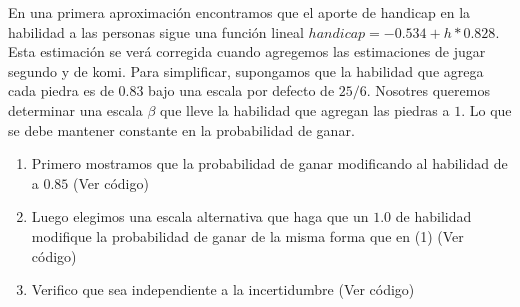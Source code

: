 \documentclass[a4paper,10pt]{article}
\begin{document}
En una primera aproximaci\'on encontramos que el aporte de handicap en la habilidad a las personas sigue una funci\'on lineal $handicap = -0.534 + h * 0.828$.
Esta estimaci\'on se ver\'a corregida cuando agregemos las estimaciones
de jugar segundo y de komi.
Para simplificar, supongamos que la habilidad que agrega cada piedra es de $0.83$ bajo una escala por defecto de $25/6$.
Nosotres queremos determinar una escala $\beta$ que lleve la habilidad que agregan las piedras a $1$.
Lo que se debe mantener constante en la probabilidad de ganar.
\begin{enumerate}
\item Primero mostramos que la probabilidad de ganar modificando al habilidad de a $0.85$ (Ver c\'odigo)
\item Luego elegimos una escala alternativa que haga que un $1.0$ de habilidad modifique la probabilidad de ganar de la misma forma que en (1) (Ver c\'odigo)
\item Verifico que sea independiente a la incertidumbre (Ver c\'odigo)
\end{enumerate}
\end{document}
